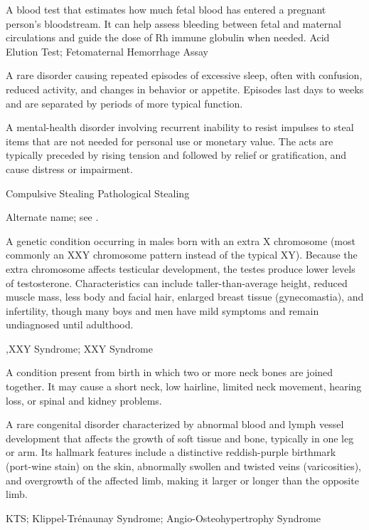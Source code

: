  A blood test that estimates how much fetal blood has entered a pregnant person's bloodstream. It can help assess bleeding between fetal and maternal circulations and guide the dose of Rh immune globulin when needed.
\synonyms
Acid Elution Test; Fetomaternal Hemorrhage Assay

 A rare disorder causing repeated episodes of excessive sleep, often with confusion, reduced activity, and changes in behavior or appetite. Episodes last days to weeks and are separated by periods of more typical function.

 A mental-health disorder involving recurrent inability to resist impulses to steal items that are not needed for personal use or monetary value. The acts are typically preceded by rising tension and followed by relief or gratification, and cause distress or impairment.

\synonyms
Compulsive Stealing
Pathological Stealing

 Alternate name; see .

 A genetic condition occurring in males born with an extra X chromosome (most commonly an XXY chromosome pattern instead of the typical XY). Because the extra chromosome affects testicular development, the testes produce lower levels of testosterone. Characteristics can include taller-than-average height, reduced muscle mass, less body and facial hair, enlarged breast tissue (gynecomastia), and infertility, though many boys and men have mild symptoms and remain undiagnosed until adulthood.

,XXY Syndrome; XXY Syndrome

 A condition present from birth in which two or more neck bones are joined together. It may cause a short neck, low hairline, limited neck movement, hearing loss, or spinal and kidney problems.

 A rare congenital disorder characterized by abnormal blood and lymph vessel development that affects the growth of soft tissue and bone, typically in one leg or arm. Its hallmark features include a distinctive reddish-purple birthmark (port-wine stain) on the skin, abnormally swollen and twisted veins (varicosities), and overgrowth of the affected limb, making it larger or longer than the opposite limb.

\synonyms
KTS; Klippel-Trénaunay Syndrome; Angio-Osteohypertrophy Syndrome

